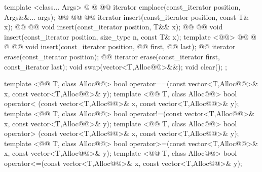 \documentclass[american,twoside]{book}
\begin{document}
\begin{codeblock}
{{    template <class... Args> 
      @ @
            @@
      iterator emplace(const_iterator position, Args&&... args);
    @@ @@ @@ 
      iterator insert(const_iterator position, const T& x);
    @@ @@
      void insert(const_iterator position, T&& x);
    @@ @@ 
      void insert(const_iterator position, size_type n, const T& x);
    template <@@>
        @@
              @ @ @@
        void insert(const_iterator position,
                    @@ first, @@ last);
    @@ iterator erase(const_iterator position);
    @@ iterator erase(const_iterator first, const_iterator last);
    void     swap(vector<T,Alloc@@>&&);
    void     clear();
  };

  template <@@ T, class Alloc@@>
    bool operator==(const vector<T,Alloc@@>& x, const vector<T,Alloc@@>& y);
  template <@@ T, class Alloc@@>
    bool operator< (const vector<T,Alloc@@>& x, const vector<T,Alloc@@>& y);
  template <@@ T, class Alloc@@>
    bool operator!=(const vector<T,Alloc@@>& x, const vector<T,Alloc@@>& y);
  template <@@ T, class Alloc@@>
    bool operator> (const vector<T,Alloc@@>& x, const vector<T,Alloc@@>& y);
  template <@@ T, class Alloc@@>
    bool operator>=(const vector<T,Alloc@@>& x, const vector<T,Alloc@@>& y);
  template <@@ T, class Alloc@@>
    bool operator<=(const vector<T,Alloc@@>& x, const vector<T,Alloc@@>& y);

}
\end{codeblock}
\end{document}
